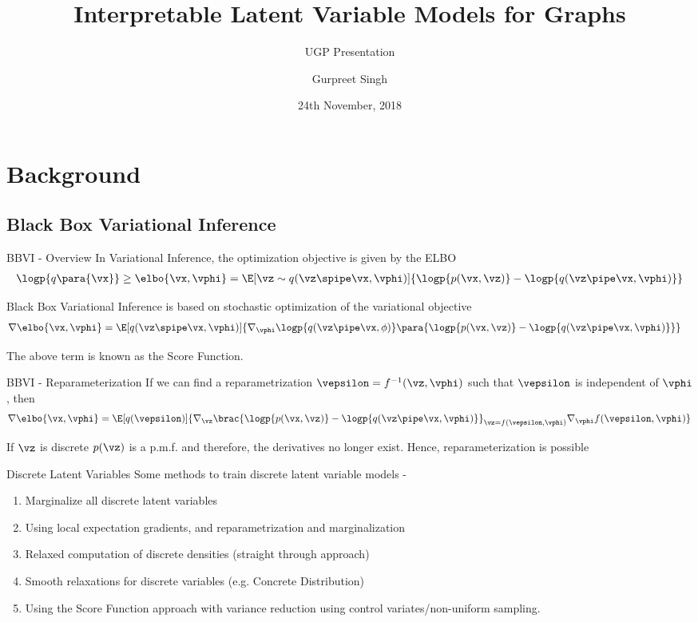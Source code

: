 \documentclass[9pt]{beamer}
\title{Interpretable Latent Variable Models for Graphs}
\subtitle{UGP Presentation}
\date{24th November, 2018}
\author{Gurpreet Singh}
\institute{Indian Institute of Technology, Kanpur}
\newcommand{\qp}{q\para}
\begin{document}
\frame{\titlepage}

\section{Background}

\subsection{Black Box Variational Inference}
\begin{frame}{BBVI - Overview}
	In Variational Inference, the optimization objective is given by the ELBO
	\begin{align*}
		\logp{\qp{\vx}} \ge \elbo{\vx, \vphi} = \E[\vz \sim q(\vz \spipe \vx, \vphi)]{\logp{p(\vx, \vz)} - \logp{q(\vz \pipe \vx, \vphi)}}
	\end{align*}

	Black Box Variational Inference is based on stochastic optimization of the variational objective
	\begin{align*}
		\nabla \elbo{\vx, \vphi} &= \E[q(\vz \spipe \vx, \vphi)]{\nabla_\vphi \logp{q(\vz \pipe \vx, \phi)} \para{\logp{p(\vx, \vz)} - \logp{q(\vz \pipe \vx, \vphi)}}}
	\end{align*}

	The above term is known as the Score Function.

\end{frame}

\begin{frame}{BBVI - Reparameterization}
	If we can find a reparametrization $\vepsilon = f^{-1}(\vz, \vphi)$ such that $\vepsilon$ is independent of $\vphi$, then
	\begin{align*}
		\nabla \elbo{\vx, \vphi} = \E[q(\vepsilon)]{\nabla_\vz \brac{\logp{p(\vx, \vz)} - \logp{q(\vz \pipe \vx, \vphi)}}_{\vz = f(\vepsilon, \vphi)} \nabla_{\vphi} f(\vepsilon, \vphi)}
	\end{align*}

	If $\vz$ is discrete $p(\vz)$ is a p.m.f. and therefore, the derivatives no longer exist. Hence, reparameterization is  possible
\end{frame}

\begin{frame}{Discrete Latent Variables}
	Some methods to train discrete latent variable models -
	\begin{enumerate}
		\item Marginalize all discrete latent variables
		\item Using local expectation gradients, and reparametrization and marginalization %
		\item Relaxed computation of discrete densities (straight through approach)
		\item Smooth relaxations for discrete variables (e.g. Concrete Distribution)
		\item Using the Score Function approach with variance reduction using control variates/non-uniform sampling.
	\end{enumerate}
\end{frame}
\end{document}
